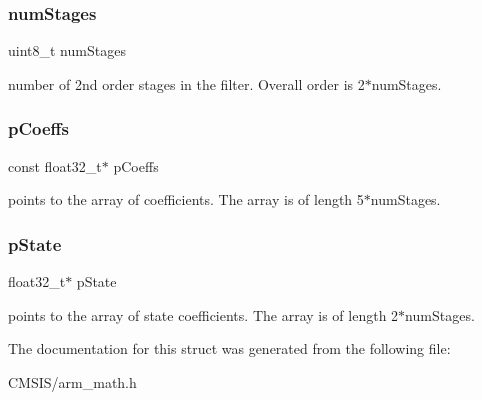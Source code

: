 \subsubsection{\texorpdfstring{numStages}{numStages}}
{\footnotesize\ttfamily uint8\+\_\+t num\+Stages}

number of 2nd order stages in the filter. Overall order is 2$\ast$num\+Stages. \mbox{\label{structarm__biquad__cascade__df2_t__instance__f32_a39230f04a29d8321948e339633780442}} 
\subsubsection{\texorpdfstring{pCoeffs}{pCoeffs}}
{\footnotesize\ttfamily const float32\+\_\+t$\ast$ p\+Coeffs}

points to the array of coefficients. The array is of length 5$\ast$num\+Stages. \mbox{\label{structarm__biquad__cascade__df2_t__instance__f32_a335c87e6fdc4b96601d95a5de8b9c463}} 
\subsubsection{\texorpdfstring{pState}{pState}}
{\footnotesize\ttfamily float32\+\_\+t$\ast$ p\+State}

points to the array of state coefficients. The array is of length 2$\ast$num\+Stages. 

The documentation for this struct was generated from the following file\+:\begin{DoxyCompactItemize}
\item 
C\+M\+S\+I\+S/arm\+\_\+math.\+h\end{DoxyCompactItemize}

